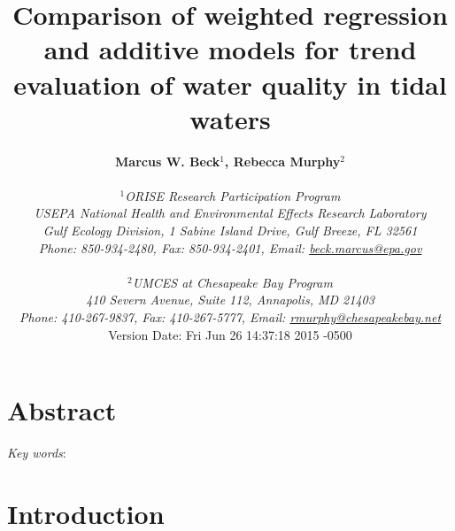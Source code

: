 \documentclass[letterpaper,12pt,oneside]{article}\usepackage[]{graphicx}\usepackage[]{color}
\begin{document}
\raggedbottom
\raggedright
{}
\setlength{\parindent}{0.5in}
\renewcommand\refname{References \vspace{12pt}}

\begin{singlespace}
\title{{\bf {\Large Comparison of weighted regression and additive models for trend evaluation of water quality in tidal waters}}}
\author{
  {\bf {\normalsize Marcus W. Beck$^1$, Rebecca Murphy$^2$}}
  \\\\{\textit {\normalsize $^1$ORISE Research Participation Program}}
  \\{\textit {\normalsize USEPA National Health and Environmental Effects Research Laboratory}}
  \\{\textit {\normalsize Gulf Ecology Division, 1 Sabine Island Drive, Gulf Breeze, FL 32561}}
	\\{\textit {\normalsize Phone: 850-934-2480, Fax: 850-934-2401, Email: \href{mailto:beck.marcus@epa.gov}{beck.marcus@epa.gov}}}
  \\\\{\textit {\normalsize $^2$UMCES at Chesapeake Bay Program}}
	\\{\textit {\normalsize 410 Severn Avenue, Suite 112, Annapolis, MD 21403}}
	\\{\textit {\normalsize Phone: 410-267-9837, Fax: 410-267-5777, Email: \href{mailto:rmurphy@chesapeakbay.net}{rmurphy@chesapeakebay.net}}}
  \vspace{1in} 
  \\ Version Date:   Fri Jun 26 14:37:18 2015 -0500
	}
\date{}
\maketitle
\end{singlespace}
\clearpage

\section*{Abstract}

\noindent \textit{Key words}:

\clearpage

\acresetall

\section{Introduction}
\end{document}
